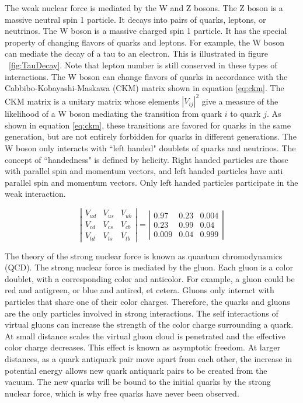 \documentclass[oneside, letterpaper, oldfontcommands]{memoir}
\begin{document}
\qquad The weak nuclear force is mediated by the W and Z bosons. The Z boson is a massive neutral spin 1 particle. It decays into pairs of quarks, leptons, or neutrinos. The W boson is a massive charged spin 1 particle. It has the special property of changing flavors of quarks and leptons. For example, the W boson can mediate the decay of a tau to an electron. This is illustrated in figure ~\ref{fig:TauDecay}. Note that lepton number is still conserved in these types of interactions. The W boson can change flavors of quarks in accordance with the Cabbibo-Kobayashi-Maskawa (CKM) matrix\cite{Agashe:2014kda} shown in equation \ref{eq:ckm}. The CKM matrix is a unitary matrix whose elements $|V_{ij}|^{2}$ give a measure of the likelihood of a W boson mediating the transition from quark $i$ to quark $j$. As shown in equation \ref{eq:ckm}, these transitions are favored for quarks in the same generation, but are not entirely forbidden for quarks in different generations. The W boson only interacts with ``left handed" doublets of quarks and neutrinos. The concept of ``handedness" is defined by helicity. Right handed particles are those with parallel spin and momentum vectors, and left handed particles have anti parallel spin and momentum vectors. Only left handed particles participate in the weak interaction.

\begin{equation}
\label{eq:ckm}
\left| \begin{array}{ccc} V_{ud} & V_{us} & V_{ub} \\ V_{cd} & V_{cs} & V_{cb} \\ V_{td} & V_{ts} & V_{tb} \end{array} \right| = \left| \begin{array}{ccc} 0.97 & 0.23 & 0.004 \\ 0.23 & 0.99 & 0.04 \\ 0.009 & 0.04 & 0.999 \end{array} \right|
\end{equation}

\qquad The theory of the strong nuclear force is known as quantum chromodynamics (QCD). The strong nuclear force is mediated by the gluon. Each gluon is a color doublet, with a corresponding color and anticolor. For example, a gluon could be red and antigreen, or blue and antired, et cetera. Gluons only interact with particles that share one of their color charges. Therefore, the quarks and gluons are the only particles involved in strong interactions. The self interactions of virtual gluons can increase the strength of the color charge surrounding a quark. At small distance scales the virtual gluon cloud is penetrated and the effective color charge decreases. This effect is known as asymptotic freedom. \cite{Halzen:1984mc} At larger distances, as a quark antiquark pair move apart from each other, the increase in potential energy allows new quark antiquark pairs to be created from the vacuum. The new quarks will be bound to the initial quarks by the strong nuclear force, which is why free quarks have never been observed. 
\end{document}
